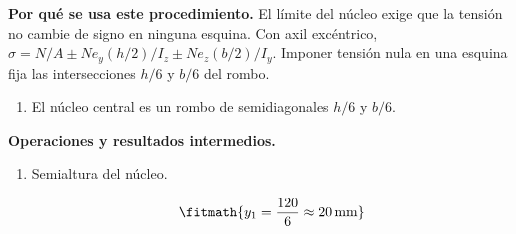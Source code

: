 \noindent\textbf{Por qué se usa este procedimiento.} El límite del núcleo exige que la tensión no cambie de signo en ninguna esquina. Con axil excéntrico, $\sigma=N/A\pm Ne_y(h/2)/I_z\pm Ne_z(b/2)/I_y$. Imponer tensión nula en una esquina fija las intersecciones $h/6$ y $b/6$ del rombo.

\begin{enumerate}

\item El núcleo central es un rombo de semidiagonales $h/6$ y $b/6$.

\end{enumerate}

\noindent\textbf{Operaciones y resultados intermedios.}

\begin{enumerate}

\item Semialtura del núcleo.

\[\fitmath{y_{1}=\frac{120}{6}\approx 20\,\mathrm{mm}}\]

\end{enumerate}
